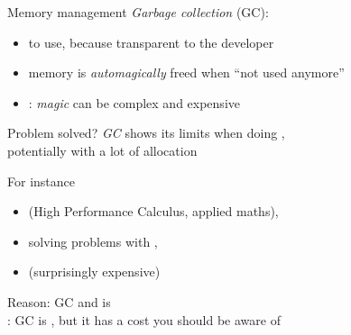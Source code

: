 \documentclass[10pt]{beamer}
\begin{document}
\begin{frame}{Memory management}
  \emph{Garbage collection} (GC):
  \begin{itemize}
    \item {} to use, because transparent to the developer
    \item memory is \emph{automagically} freed when ``not used anymore''
    \item<2-> : \emph{magic} can be complex and expensive
  \end{itemize}
  \bigskip{}
  \bigskip
\end{frame}




\begin{frame}{Problem solved?}
  \emph{GC} shows its limits when doing ,\\
  potentially with a lot of allocation
  \bigskip

  For instance
  \smallskip
  \begin{itemize}\bigsep
    \item {} \hfill (High Performance Calculus, applied maths),
    \item solving problems with ,
    \item {} \hfill (surprisingly expensive)
  \end{itemize}
  \bigskip

  Reason: GC  and is  \\
  \pause
  : GC is , but it has a cost you should be aware of
\end{frame}
\end{document}

